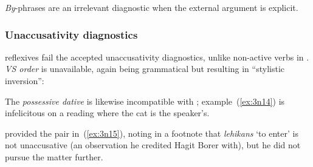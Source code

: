 \begin{exe}
\begin{xlist}
\begin{xlist}
\begin{exe}
\begin{xlist}
\begin{xlist}
\begin{exe}
\begin{xlist}
\begin{xlist}
\begin{exe}
\begin{exe}
\begin{xlist}
\begin{exe}
\begin{exe}
\begin{xlist}
\begin{exe}
\begin{exe}
\emph{By}-phrases are an irrelevant diagnostic when the external argument is explicit.

		\subsubsection{Unaccusativity diagnostics} \label{vz:tnif:figrefl:unacc}
 reflexives fail the accepted unaccusativity diagnostics, unlike non-active verbs in {\tnif}. \textit{VS order} is unavailable, again being grammatical but resulting in ``stylistic inversion'':
 \begin{exe}\judgewidth{\#}
	
 \z 

The \textit{possessive dative} is likewise incompatible with ; example~(\ref{ex:3n14}) is infelicitous on a reading where the cat is the speaker's.
 \begin{exe}\judgewidth{\#}
	
 \z 

\citet[134]{shlonsky87} provided the pair in~(\ref{ex:3n15}), noting in a footnote that \emph{lehikans} `to enter' is not unaccusative (an observation he credited Hagit Borer with), but he did not pursue the matter further.
 \begin{exe}
 \ex  \label{ex:3n15}
 \begin{xlist} 
		
		

\end{xlist}
\end{exe}
\end{exe}
\end{exe}
\end{exe}
\end{exe}
\end{xlist}
\end{exe}
\end{exe}
\end{xlist}
\end{exe}
\end{exe}
\end{xlist}
\end{xlist}
\end{exe}
\end{xlist}
\end{xlist}
\end{exe}
\end{xlist}
\end{xlist}
\end{exe}
